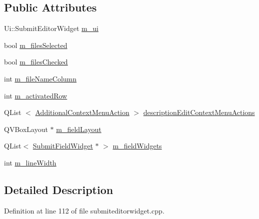 \subsection*{\-Public \-Attributes}
\begin{DoxyCompactItemize}
\item 
\-Ui\-::\-Submit\-Editor\-Widget \hyperlink{struct_utils_1_1_submit_editor_widget_private_a5476c01db3bc97951db656048ab0c0c8}{m\-\_\-ui}
\item 
bool \hyperlink{struct_utils_1_1_submit_editor_widget_private_ae84602f3befda38e44858e5cc60f79be}{m\-\_\-files\-Selected}
\item 
bool \hyperlink{struct_utils_1_1_submit_editor_widget_private_aeb1241360fb4385d02bd11f12192dc51}{m\-\_\-files\-Checked}
\item 
int \hyperlink{struct_utils_1_1_submit_editor_widget_private_ab07726bb11a9c52f9a0915170c6bb0fd}{m\-\_\-file\-Name\-Column}
\item 
int \hyperlink{struct_utils_1_1_submit_editor_widget_private_a6827b630168b2e2696d7409ecfbb179f}{m\-\_\-activated\-Row}
\item 
\-Q\-List\*
$<$ \hyperlink{struct_utils_1_1_submit_editor_widget_private_adb3c92b95990f75654e9c25101be736d}{\-Additional\-Context\-Menu\-Action} $>$ \hyperlink{struct_utils_1_1_submit_editor_widget_private_a789ad5be9463cbc80cdd09e3575050ca}{description\-Edit\-Context\-Menu\-Actions}
\item 
\-Q\-V\-Box\-Layout $\ast$ \hyperlink{struct_utils_1_1_submit_editor_widget_private_aec37bbec70dab7d4c0cf949fac9d2433}{m\-\_\-field\-Layout}
\item 
\-Q\-List$<$ \hyperlink{class_utils_1_1_submit_field_widget}{\-Submit\-Field\-Widget} $\ast$ $>$ \hyperlink{struct_utils_1_1_submit_editor_widget_private_abde8ff2c29d77121652458c01a6146d9}{m\-\_\-field\-Widgets}
\item 
int \hyperlink{struct_utils_1_1_submit_editor_widget_private_a26a9f360cbc9440cbbdcb9f5b9897807}{m\-\_\-line\-Width}
\end{DoxyCompactItemize}


\subsection{\-Detailed \-Description}


\-Definition at line 112 of file submiteditorwidget.\-cpp.



